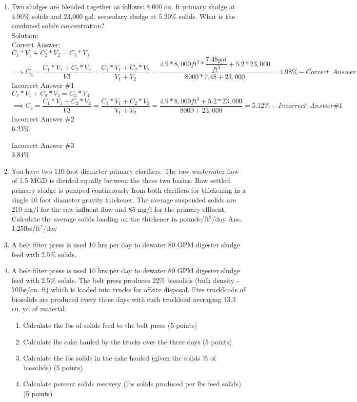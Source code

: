 \begin{enumerate}
\item Two sludges are blended together as follows: 8,000 cu. ft primary sludge at 4.90\% solids and 23,000 gal. secondary sludge at 5.20\% solids. What is the combined solids concentration?\\
Solution:\\
Correct Answer:\\

$
C_1*V_1 + C_2*V_2 = C_3*V_3$\\
$\implies C_3 = \dfrac{C_1*V_1 + C_2*V_2}{V3}=\dfrac{C_1*V_1 + C_2*V_2}{V_1 + V_2}=\dfrac{4.9*8,000ft^3*\dfrac{7.48gal}{ft^3} + 5.2*23,000}{8000*7.48 + 23,000}=\boxed{4.98\%} - Correct \enspace Answer
$\\

\vspace{0.25cm}
Incorrect Answer \#1\\
$
C_1*V_1 + C_2*V_2 = C_3*V_3$\\
$\implies C_3 = \dfrac{C_1*V_1 + C_2*V_2}{V3}=\dfrac{C_1*V_1 + C_2*V_2}{V_1 + V_2}=\dfrac{4.9*8,000ft^3 + 5.2*23,000}{8000 + 23,000}=\boxed{5.12\%} - Incorrect \enspace Answer \#1
$\\

\vspace{0.25cm}
Incorrect Answer \#2\\
6.23\%

\vspace{0.25cm}
Incorrect Answer \#3\\
3.84\%

\item You have two  110  foot diameter primary  clarifiers.  The raw  wastewater flow of 1.5  MGD is divided equally  between the these two  basins.   Raw settled primary sludge  is pumped continuously  from both clarifiers  for thickening  in  a single  40 foot  diameter gravity thickener.  The average suspended  solids are 210  mg/l for the raw influent flow and 85 mg/l for the primary effluent.  Calculate the  average solids  loading on the thickener in pounds/ft$^2$/day
Ans. 1.25lbs/ft$^2$/day


\item A belt filter press is used 10 hrs per day to dewater 80 GPM digester sludge feed with 2.5\% solids.


\item A belt filter press is used 10 hrs per day to dewater 80 GPM digester sludge feed with 2.5\% solids. The belt press produces 22\% biosolids (bulk density - 70lbs/cu. ft) which is loaded into trucks for offsite disposal. Five truckloads of biosolids are produced every three days with each truckload averaging 13.3 cu. yd of material.
\begin{enumerate}
\item Calculate the lbs of solids feed to the belt press (5 points) 
\item Calculate lbs cake hauled by the trucks over the three days (5 points) 
\item Calculate the lbs solids in the cake hauled (given the solids \% of biosolids) (5 points) 
\item Calculate percent solids recovery (lbs solids produced per lbs feed solids) (5 points) 


\end{enumerate}
\end{enumerate}
